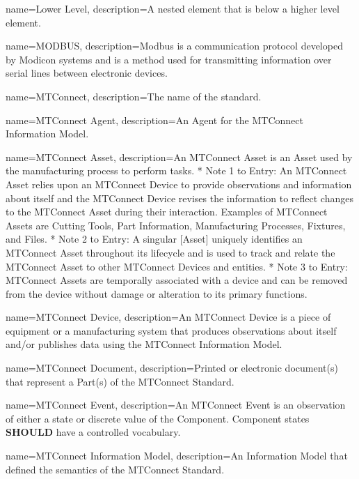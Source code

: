 {
    name={Lower Level},
	description={A nested element that is below a higher level element.}
}

{
    name={MODBUS},
	description={Modbus is a communication protocol developed by Modicon systems and is a method used for transmitting information over serial lines between electronic devices.}
}

{
    name={MTConnect},
	description={The name of the standard.}
}

{
    name={MTConnect Agent},
	description={An \gls{Agent} for the \gls{MTConnect Information Model}.}
}

{
    name={MTConnect Asset},
	description={An \gls{MTConnect Asset} is an \gls{Asset} used by the manufacturing process to perform tasks.
* Note 1 to Entry: An \gls{MTConnect Asset} relies upon an \gls{MTConnect Device} to provide \glspl{observation} and information about itself and the \gls{MTConnect Device} revises the information to reflect changes to the \gls{MTConnect Asset} during their interaction. Examples of \glspl{MTConnect Asset} are Cutting Tools, Part Information, Manufacturing Processes, Fixtures, and Files.
* Note 2 to Entry: A singular [Asset] uniquely identifies an \gls{MTConnect Asset} throughout its lifecycle and is used to track and relate the \gls{MTConnect Asset} to other \glspl{MTConnect Device} and entities.
* Note 3 to Entry: \glspl{MTConnect Asset} are temporally associated with a device and can be removed from the device without damage or alteration to its primary functions.}
}

{
    name={MTConnect Device},
	description={An \gls{MTConnect Device} is a piece of equipment or a manufacturing system that produces \glspl{observation} about itself and/or publishes data using the \gls{MTConnect Information Model}.}
}

{
    name={MTConnect Document},
	description={Printed or electronic document(s) that represent a Part(s) of the MTConnect Standard.}
}

{
    name={MTConnect Event},
	description={An \gls{MTConnect Event} is an \gls{observation} of either a state or discrete value of the \gls{Component}. \gls{Component} states \textbf{SHOULD} have a controlled vocabulary.
}
}

{
    name={MTConnect Information Model},
	description={An \gls{Information Model} that defined the semantics of the MTConnect Standard.}
}

